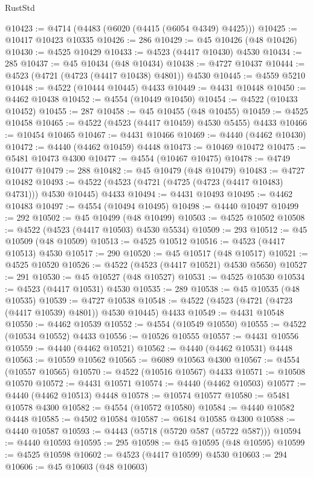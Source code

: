 \begin{lexlean}{RustStd}
\begin{coremodule}
{\begin{coremodule}
{{{{{{{{{{{{{{{{{{{{{{{{{{{{{{{{{{{{{{{{{{{{{{{{{{{{{{{{{{{{@10423 := @4714 (@4483 (@6020 (@4415 (@6054 @4349) @4425)))
@10425 := @10417 @10423 @10335
@10426 := 286
@10429 := @45 @10426 (@48 @10426)
@10430 := @4525 @10429
@10433 := @4523 (@4417 @10430) @4530
@10434 := 285
@10437 := @45 @10434 (@48 @10434)
@10438 := @4727 @10437
@10444 := @4523 (@4721 (@4723 (@4417 @10438) @4801)) @4530
@10445 := @4559 @5210
@10448 := @4522 (@10444 @10445) @4433
@10449 := @4431 @10448
@10450 := @4462 @10438
@10452 := @4554 (@10449 @10450)
@10454 := @4522 (@10433 @10452)
@10455 := 287
@10458 := @45 @10455 (@48 @10455)
@10459 := @4525 @10458
@10465 := @4522 (@4523 (@4417 @10459) @4530 @5455) @4433
@10466 := @10454 @10465
@10467 := @4431 @10466
@10469 := @4440 (@4462 @10430)
@10472 := @4440 (@4462 @10459) @4448
@10473 := @10469 @10472
@10475 := @5481 @10473 @4300
@10477 := @4554 (@10467 @10475)
@10478 := @4749 @10477
@10479 := 288
@10482 := @45 @10479 (@48 @10479)
@10483 := @4727 @10482
@10493 := @4522 (@4523 (@4721 (@4725 (@4723 (@4417 @10483) @4731))) @4530 @10445) @4433
@10494 := @4431 @10493
@10495 := @4462 @10483
@10497 := @4554 (@10494 @10495)
@10498 := @4440 @10497
@10499 := 292
@10502 := @45 @10499 (@48 @10499)
@10503 := @4525 @10502
@10508 := @4522 (@4523 (@4417 @10503) @4530 @5534)
@10509 := 293
@10512 := @45 @10509 (@48 @10509)
@10513 := @4525 @10512
@10516 := @4523 (@4417 @10513) @4530
@10517 := 290
@10520 := @45 @10517 (@48 @10517)
@10521 := @4525 @10520
@10526 := @4522 (@4523 (@4417 @10521) @4530 @5650)
@10527 := 291
@10530 := @45 @10527 (@48 @10527)
@10531 := @4525 @10530
@10534 := @4523 (@4417 @10531) @4530
@10535 := 289
@10538 := @45 @10535 (@48 @10535)
@10539 := @4727 @10538
@10548 := @4522 (@4523 (@4721 (@4723 (@4417 @10539) @4801)) @4530 @10445) @4433
@10549 := @4431 @10548
@10550 := @4462 @10539
@10552 := @4554 (@10549 @10550)
@10555 := @4522 (@10534 @10552) @4433
@10556 := @10526 @10555
@10557 := @4431 @10556
@10559 := @4440 (@4462 @10521)
@10562 := @4440 (@4462 @10531) @4448
@10563 := @10559 @10562
@10565 := @6089 @10563 @4300
@10567 := @4554 (@10557 @10565)
@10570 := @4522 (@10516 @10567) @4433
@10571 := @10508 @10570
@10572 := @4431 @10571
@10574 := @4440 (@4462 @10503)
@10577 := @4440 (@4462 @10513) @4448
@10578 := @10574 @10577
@10580 := @5481 @10578 @4300
@10582 := @4554 (@10572 @10580)
@10584 := @4440 @10582 @4448
@10585 := @4502 @10584
@10587 := @6184 @10585 @4300
@10588 := @4440 @10587
@10593 := @4443 (@5718 (@5720 @587 (@5722 @587)))
@10594 := @4440 @10593
@10595 := 295
@10598 := @45 @10595 (@48 @10595)
@10599 := @4525 @10598
@10602 := @4523 (@4417 @10599) @4530
@10603 := 294
@10606 := @45 @10603 (@48 @10603)
}}}}}}}}}}}}}}}}}}}}}}}}}}}}}}}}}}}}}}}}}}}}}}}}}}}}}}}}}}}}
\end{coremodule}}
\end{coremodule}
\end{lexlean}
